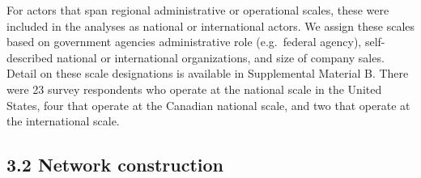 \documentclass[twoside,12pt,final]{ucthesis-CA2012}
\begin{document}
\begin{ucmainmatter}
For actors that span regional administrative or operational scales,
these were included in the analyses as \textquotesingle national\textquotesingle{} or \textquotesingle international\textquotesingle{}
actors. We assign these scales based on government agencies\textquotesingle{}
administrative role (e.g.~federal agency), self-described \textquotesingle national\textquotesingle{}
or \textquotesingle international\textquotesingle{} organizations, and size of company sales. Detail on
these scale designations is available in Supplemental Material B. There
were 23 survey respondents who operate at the national scale in the
United States, four that operate at the Canadian national scale, and two
that operate at the international scale.
\begin{table}

\caption{(\#tab:table2.1)Organic seed innovation system sample population and survey response rate by operational scale and geography}
\centering
{}
\end{table}
\hypertarget{network-construction}{%
\subsection{3.2 Network construction}\label{network-construction}}


\end{ucmainmatter}
\end{document}
